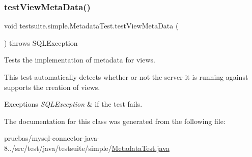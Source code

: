 \mbox{\label{classtestsuite_1_1simple_1_1_metadata_test_a57723e10153ca42cc7eac867f896d662}} 
\subsubsection{\texorpdfstring{test\+View\+Meta\+Data()}{testViewMetaData()}}
{\footnotesize\ttfamily void testsuite.\+simple.\+Metadata\+Test.\+test\+View\+Meta\+Data (\begin{DoxyParamCaption}{ }\end{DoxyParamCaption}) throws S\+Q\+L\+Exception}

Tests the implementation of metadata for views.

This test automatically detects whether or not the server it is running against supports the creation of views.


\begin{DoxyExceptions}{Exceptions}
{\em S\+Q\+L\+Exception} & if the test fails. \\
\hline
\end{DoxyExceptions}


The documentation for this class was generated from the following file\+:\begin{DoxyCompactItemize}
\item 
pruebas/mysql-\/connector-\/java-\/8../src/test/java/testsuite/simple/\mbox{\hyperlink{simple_2_metadata_test_8java}{Metadata\+Test.\+java}}\end{DoxyCompactItemize}
